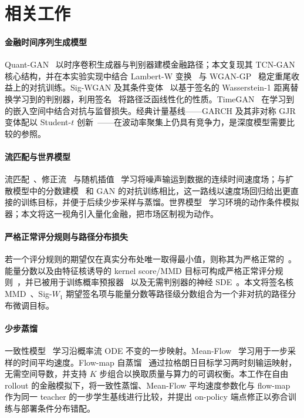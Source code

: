 \documentclass[11pt]{ctexart}
\begin{document}
\section{相关工作}
\label{sec:related}

\paragraph{金融时间序列生成模型}
Quant-GAN~\citep{wiese2020quant} 以时序卷积生成器与判别器建模金融路径；本文复现其 TCN-GAN 核心结构，并在本实验实现中结合 Lambert-W 变换~\citep{goerg2015lambert} 与 WGAN-GP~\citep{gulrajani2017improved} 稳定重尾收益上的对抗训练。Sig-WGAN 及其条件变体~\citep{ni2021sigwgan,ni2020conditional} 以基于签名的 Wasserstein-1 距离替换学习到的判别器，利用签名~\citep{lyons2007differential} 将路径泛函线性化的性质。TimeGAN~\citep{yoon2019timegan} 在学习到的嵌入空间中结合对抗与监督损失。经典计量基线——GARCH 及其非对称 GJR 变体配以 Student-$t$ 创新~\citep{bollerslev1986garch,glosten1993relation,bollerslev1987conditionally}——在波动率聚集上仍具有竞争力，是深度模型需要比较的参照。

\paragraph{流匹配与世界模型}
流匹配~\citep{lipman2023flow}、修正流~\citep{liu2023rectified} 与随机插值~\citep{albergo2023stochastic} 学习将噪声输运到数据的连续时间速度场；与扩散模型中的分数建模~\citep{ho2020denoising,karras2022elucidating} 和 GAN 的对抗训练相比，这一路线以速度场回归给出更直接的训练目标，并便于后续少步采样与蒸馏。世界模型~\citep{ha2018world,alonso2024diamond} 学习环境的动作条件模拟器；本文将这一视角引入量化金融，把市场区制视为动作。

\paragraph{严格正常评分规则与路径分布损失}
若一个评分规则的期望仅在真实分布处唯一取得最小值，则称其为严格正常的~\citep{gneiting2007strictly}。能量分数以及由特征核诱导的 kernel score/MMD 目标可构成严格正常评分规则~\citep{gretton2012kernel}，并已被用于训练概率预报器~\citep{pacchiardi2024probabilistic} 以及无需判别器的神经 SDE~\citep{issa2023nonadversarial}。本文将签名核 MMD~\citep{salvi2021signature}、Sig-$W_1$ 期望签名项与能量分数等路径级分数组合为一个非对抗的路径分布微调目标。

\paragraph{少步蒸馏}
一致性模型~\citep{song2023consistency,song2024improved} 学习沿概率流 ODE 不变的一步映射。Mean-Flow~\citep{geng2025meanflow} 学习用于一步采样的时间平均速度。Flow-map 自蒸馏~\citep{boffi2025flowmaps} 通过拉格朗日目标学习两时刻输运映射，无需空间导数，并支持 $K$ 步组合以换取质量与算力的可调权衡。本工作在自由 rollout 的金融模拟下，将一致性蒸馏、Mean-Flow 平均速度参数化与 flow-map 作为同一 teacher 的一步学生基线进行比较，并提出 on-policy 端点修正以弥合训练与部署条件分布错配。
\end{document}

